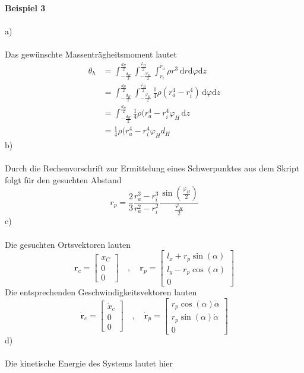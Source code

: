 \newpage
\noindent
\textbf{Beispiel 3}\\ \\
a)\\ \\
Das gewünschte Massenträgheitsmoment lautet
\begin{align*}
	\theta_h &= \int_{-\frac{d_H}{2}}^{\frac{d_H}{2}}\int_{-\frac{\varphi_H}{2}}^{\frac{\varphi_H}{2}}\int_{r_i}^{r_a}\rho r^3\,\text{d}r\text{d}\varphi\text{d}z \\
	&= \int_{-\frac{d_H}{2}}^{\frac{d_H}{2}}\int_{-\frac{\varphi_H}{2}}^{\frac{\varphi_H}{2}}\frac{1}{4}\rho(r_a^4 - r_i^4)\,\text{d}\varphi\text{d}z \\
	&=  \int_{-\frac{d_H}{2}}^{\frac{d_H}{2}}\frac{1}{4}\rho(r_a^4 - r_i^4\varphi_H\,\text{d}z \\
	&=\frac{1}{4}\rho(r_a^4 - r_i^4\varphi_Hd_H
\end{align*}
b) \\ \\
Durch die Rechenvorschrift zur Ermittelung eines Schwerpunktes aus dem Skript folgt für den gesuchten Abstand
\[
	r_p = \frac{2}{3}\frac{r_a^3 - r_i^3}{r_a^2 - r_i^2}\frac{\sin\left(\frac{\varphi_H}{2}\right)}{\frac{\varphi_H}{2}}
\]
c)\\ \\
Die gesuchten Ortsvektoren lauten
\[
	\textbf{r}_c = \begin{bmatrix}
		x_C \\
		0 \\
		0
	\end{bmatrix}
	\quad,\quad
	\textbf{r}_p = \begin{bmatrix}
		l_x + r_p\sin(\alpha) \\
		l_y - r_p\cos(\alpha) \\
		0
	\end{bmatrix}
\]
Die entsprechenden Geschwindigkeitsvektoren lauten
\[
	\dot{\textbf{r}}_c = \begin{bmatrix}
		\dot{x}_c \\
		0 \\
		0		
	\end{bmatrix}
	\quad,\quad
	\dot{\textbf{r}}_p = \begin{bmatrix}
		r_p\cos(\alpha)\dot{\alpha} \\
		r_p\sin(\alpha)\dot{\alpha} \\
		0
	\end{bmatrix}
\]
d) \\ \\
Die kinetische Energie des Systems lautet hier
